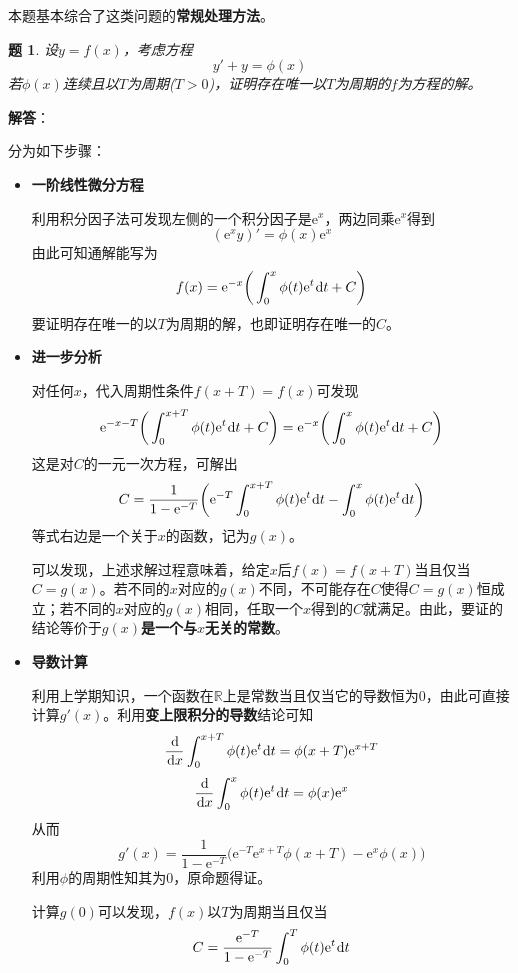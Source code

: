 \documentclass[a4paper,UTF8,fontset=windows,AutoFakeBold]{ctexart}
\newcommand*{\dr}{\hspace{0.07em}\mathrm{d}}
\newcommand*{\er}{\mathrm{e}}
\newcommand*{\rb}{\mathbb{R}}
\newcommand*{\note}{\noindent *}
\theoremstyle{ex}
\newtheorem{exercise}{题}
\newcommand{\sol}[1]{{\vspace{5pt}\kaishu\noindent\textbf{解答}：\vspace{-3pt}
\begin{compactitem}
    \item[] #1
\end{compactitem}
}}
\begin{document}
\note 本题基本综合了这类问题的\textbf{常规处理方法}。

\begin{framed}
\begin{exercise}
    设$y=f(x)$，考虑方程
    $$y'+y=\phi(x)$$
    若$\phi(x)$连续且以$T$为周期($T>0$)，证明存在唯一以$T$为周期的$f$为方程的解。
\end{exercise}
\sol{
    分为如下步骤：
    \begin{itemize}
        \item \textbf{一阶线性微分方程}
        
        利用积分因子法可发现左侧的一个积分因子是$\er^x$，两边同乘$\er^x$得到
        $$(\er^xy)'=\phi(x)\er^x$$
        由此可知通解能写为
        $$f(x)=\er^{-x}\bigg(\int_0^x\phi(t)\er^t\dr t+C\bigg)$$
        要证明存在唯一的以$T$为周期的解，也即证明存在唯一的$C$。

        \item \textbf{进一步分析}
        
        对任何$x$，代入周期性条件$f(x+T)=f(x)$可发现
        $$\er^{-x-T}\bigg(\int_0^{x+T}\phi(t)\er^t\dr t+C\bigg)=\er^{-x}\bigg(\int_0^x\phi(t)\er^t\dr t+C\bigg)$$
        这是对$C$的一元一次方程，可解出
        $$C=\frac{1}{1-\er^{-T}}\bigg(\er^{-T}\int_0^{x+T}\phi(t)\er^t\dr t-\int_0^x\phi(t)\er^t\dr t\bigg)$$
        等式右边是一个关于$x$的函数，记为$g(x)$。

        可以发现，上述求解过程意味着，给定$x$后$f(x)=f(x+T)$当且仅当$C=g(x)$。若不同的$x$对应的$g(x)$不同，不可能存在$C$使得$C=g(x)$恒成立；若不同的$x$对应的$g(x)$相同，任取一个$x$得到的$C$就满足。由此，要证的结论等价于$g(x)$\textbf{是一个与$x$无关的常数}。

        \item \textbf{导数计算}
        
        利用上学期知识，一个函数在$\rb$上是常数当且仅当它的导数恒为0，由此可直接计算$g'(x)$。利用\textbf{变上限积分的导数}结论可知
        $$\frac{\dr}{\dr x}\int_0^{x+T}\phi(t)\er^t\dr t=\phi(x+T)\er^{x+T}$$
        $$\frac{\dr}{\dr x}\int_0^x\phi(t)\er^t\dr t=\phi(x)\er^x$$
        从而
        $$g'(x)=\frac{1}{1-\er^{-T}}\big(\er^{-T}\er^{x+T}\phi(x+T)-\er^x\phi(x)\big)$$
        利用$\phi$的周期性知其为0，原命题得证。

        计算$g(0)$可以发现，$f(x)$以$T$为周期当且仅当
        $$C=\frac{\er^{-T}}{1-\er^{-T}}\int_0^T\phi(t)\er^t\dr t$$
    \end{itemize}
}
\end{framed}
\end{document}
